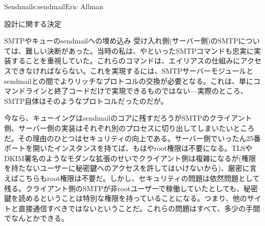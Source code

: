 \begin{aosachapter}{Sendmail}{s:sendmail}{Eric Allman}
\begin{aosasect1}{設計に関する決定}
\begin{aosasect2}{SMTPやキューのsendmailへの埋め込み}
受け入れ側(サーバー側)のSMTPについては、難しい決断があった。当時の私は、やといったSMTPコマンドも忠実に実装することを重視していた。これらのコマンドは、エイリアスの仕組みにアクセスできなければならない。これを実現するには、SMTPサーバーモジュールとsendmailとの間でよりリッチなプロトコルの交換が必要となる。これは、単にコマンドラインと終了コードだけで実現できるものではない---実際のところ、SMTP自体はそのようなプロトコルだったのだが。

今なら、キューイングはsendmailのコアに残すだろうがSMTPのクライアント側、サーバー側の実装はそれぞれ別のプロセスに切り出してしまいたいところだ。その理由のひとつはセキュリティの向上である。サーバー側でいったん25番ポートを開いたインスタンスを持てば、もはやroot権限は不要になる。TLSやDKIM署名のようなモダンな拡張のせいでクライアント側は複雑になるが(権限を持たないユーザーに秘密鍵へのアクセスを許してはいけないから)、厳密に言えばこちらもroot権限は不要だ。しかし、セキュリティの問題は依然問題として残る。クライアント側のSMTPが非rootユーザーで稼働していたとしても、秘密鍵を読めるということは特別な権限を持っていることになる。つまり、他のサイトと直接通信すべきではないということだ。これらの問題はすべて、多少の手間でなんとかできる。

\end{aosasect2}


\end{aosasect1}
\end{aosachapter}
